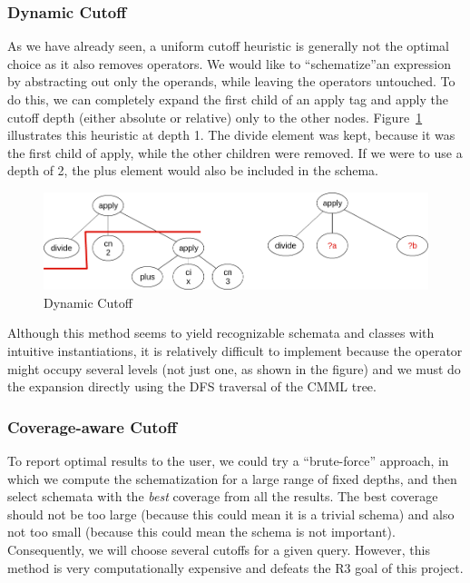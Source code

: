 \documentclass[a4paper,oneside]{article}
\begin{document}
\subsubsection{Dynamic Cutoff}\label{subsubsec:dynamic_cutoff}
As we have already seen, a uniform cutoff heuristic is generally not the
optimal choice as it also removes operators. We would like to ``schematize''an
expression by abstracting out only the operands, while leaving the operators
untouched. To do this, we can completely expand the first child of an
\textsf{apply} tag and apply the cutoff depth (either absolute or relative)
only to the other nodes. Figure~\ref{fig:cutoff_dynamic} illustrates this
heuristic at depth 1. The \textsf{divide} element was kept, because it was the
first child of \textsf{apply}, while the other children were removed.
If we were to use a depth of 2, the \textsf{plus} element would also be
included in the schema.

\begin{figure}[ht]\centering
    \includegraphics[scale=0.3]{img/cutoff_dynamic.png}
    \caption{Dynamic Cutoff}\label{fig:cutoff_dynamic}
\end{figure}
\FloatBarrier

Although this method seems to yield recognizable schemata and classes with
intuitive instantiations, it is relatively difficult to implement because the
operator might occupy several levels (not just one, as shown in the figure) and
we must do the expansion directly using the DFS traversal of the CMML tree.

\subsubsection{Coverage-aware Cutoff}\label{subsubsec:coverage_aware_cutoff}
To report optimal results to the user, we could try a ``brute-force'' approach,
in which we compute the schematization for a large range of fixed depths, and
then select schemata with the \textit{best} coverage from all the results. The
best coverage should not be too large (because this could mean it is a trivial
schema) and also not too small (because this could mean the schema is not
important). Consequently, we will choose several cutoffs for a given query.
However, this method is very computationally expensive and defeats
the \textsf{R3} goal of this project.
\end{document}
